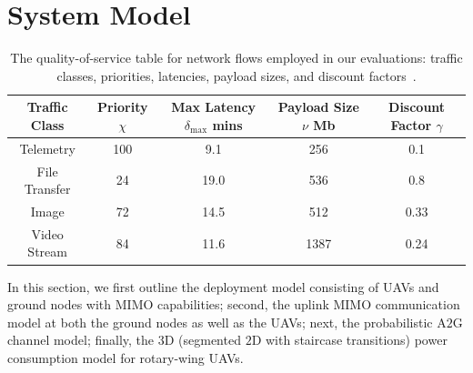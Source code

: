 \documentclass[10pt, twocolumn]{IEEEtran}
\begin{document}
\section{System Model}\label{S2}
\begin{table} [tb]
	\centering
	\begin{tabular}{|c|c|c|c|c|}
		\hline
		\textbf{Traffic Class} & \textbf{Priority} $\chi$ & \textbf{Max Latency} $\delta_{\mathrm{max}}$ mins & \textbf{Payload Size} $\nu$ Mb & \textbf{Discount Factor} $\gamma$\\
		\hline
		Telemetry & 100 & 9.1 & 256 & 0.1\\
		\hline
		File Transfer & 24 & 19.0 & 536 & 0.8\\
		\hline
		Image & 72 & 14.5 & 512 & 0.33\\
		\hline
		Video Stream & 84 & 11.6 & 1387 & 0.24\\
		\hline
	\end{tabular}
	\caption{The quality-of-service table for network flows employed in our evaluations: traffic classes, priorities, latencies, payload sizes, and discount factors~\cite{DARPA:SC2}.}
    \vspace{-6mm}
	\label{T1}
\end{table}
\normalsize
In this section, we first outline the deployment model consisting of UAVs and ground nodes with MIMO capabilities; second, the uplink MIMO communication model at both the ground nodes as well as the UAVs; next, the probabilistic A$2$G channel model; finally, the $3$D (segmented $2$D with staircase transitions) power consumption model for rotary-wing UAVs.\\
\end{document}
